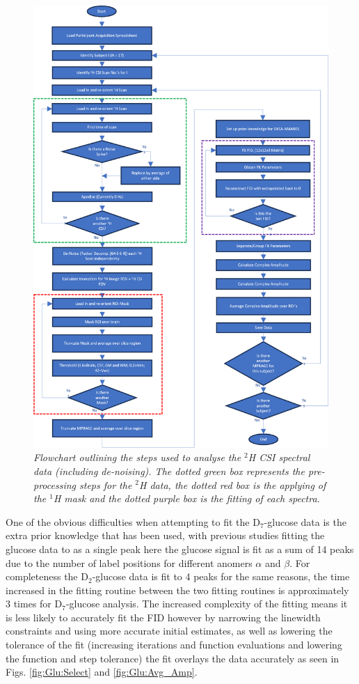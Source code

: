 \begin{figure}
    \centering
    \includegraphics[width = 1\textwidth]{Figures/Glucose/2H_Flow.png}
    \caption{\textit{Flowchart outlining the steps used to analyse the $^2$H \ac{CSI} spectral data (including de-noising). The dotted green box represents the pre-processing steps for the $^2$H data, the dotted red box is the applying of the $^1$H mask and the dotted purple box is the fitting of each spectra.}}
    \label{fig:Glu:2H_Flow}
\end{figure}

One of the obvious difficulties when attempting to fit the D$_7$-glucose data is the extra prior knowledge that has been used, with previous studies fitting the glucose data to as a single peak here the glucose signal is fit as a sum of 14 peaks due to the number of label positions for different anomers $\alpha$ and $\beta$. For completeness the D$_2$-glucose data is fit to 4 peaks for the same reasons, the time increased in the fitting routine between the two fitting routines is approximately 3 times for D$_7$-glucose analysis. The increased complexity of the fitting means it is less likely to accurately fit the \ac{FID} however by narrowing the linewidth constraints and using more accurate initial estimates, as well as lowering the tolerance of the fit (increasing iterations and function evaluations and lowering the function and step tolerance) the fit overlays the data accurately as seen in Figs. \ref{fig:Glu:Select} and \ref{fig:Glu:Avg_Amp}. 

